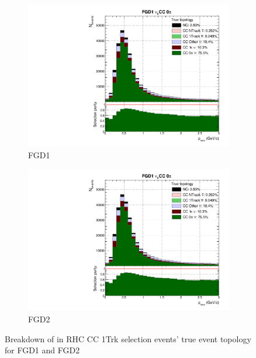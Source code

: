 \begin{figure}[!h]
	\begin{subfigure}[t]{0.49\textwidth}
		\includegraphics[width=\textwidth,page=21, trim={0mm 0mm 0mm 9mm}, clip]{figures/mach3/selection/2017b_Diag_WithSelection}
		\caption{FGD1}
	\end{subfigure}
	\begin{subfigure}[t]{0.49\textwidth}
		\includegraphics[width=\textwidth,page=25, trim={0mm 0mm 0mm 9mm}, clip]{figures/mach3/selection/2017b_Diag_WithSelection}
		\caption{FGD2}
	\end{subfigure}
	\caption{Breakdown of \numu in RHC CC 1Trk selection events' true event topology for FGD1 and FGD2 }
	\label{fig:ccnubarnu1trk_topology}
\end{figure}

